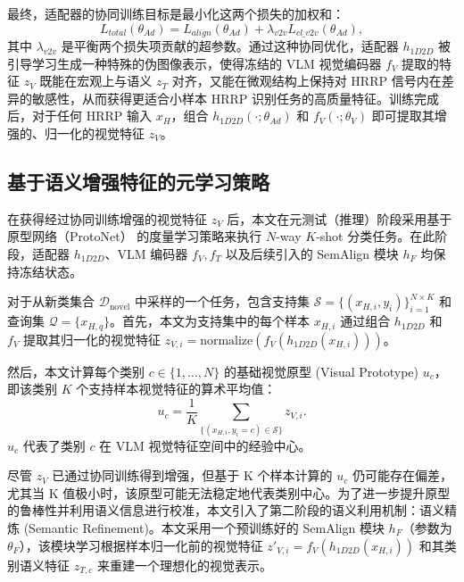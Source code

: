 最终，适配器的协同训练目标是最小化这两个损失的加权和： \begin{equation} L_{total}(\theta_{Ad}) = L_{align}(\theta_{Ad}) + \lambda_{v2v} L_{cl\_v2v}(\theta_{Ad}), \label{eq:adapter_total_loss} \end{equation} 其中 $\lambda_{v2v}$ 是平衡两个损失项贡献的超参数。通过这种协同优化，适配器 $h_{1D2D}$ 被引导学习生成一种特殊的伪图像表示，使得冻结的 VLM 视觉编码器 $f_V$ 提取的特征 $z_V$ 既能在宏观上与语义 $z_T$ 对齐，又能在微观结构上保持对 HRRP 信号内在差异的敏感性，从而获得更适合小样本 HRRP 识别任务的高质量特征。训练完成后，对于任何 HRRP 输入 $x_H$，组合 $h_{1D2D}(\cdot; \theta_{Ad})$ 和 $f_V(\cdot; \theta_V)$ 即可提取其增强的、归一化的视觉特征 $z_V$。

\subsection{基于语义增强特征的元学习策略}
\label{subsec:semantic_fsl_strategy}

在获得经过协同训练增强的视觉特征 $z_V$ 后，本文在元测试（推理）阶段采用基于原型网络（ProtoNet） 的度量学习策略来执行 $N$-way $K$-shot 分类任务。在此阶段，适配器 $h_{1D2D}$、VLM 编码器 $f_V, f_T$ 以及后续引入的 SemAlign 模块 $h_F$ 均保持冻结状态。

对于从新类集合 $\mathcal{D}_{\text{novel}}$ 中采样的一个任务，包含支持集 $\mathcal{S} = \{(x_{H,i}, y_i)\}_{i=1}^{N \times K}$ 和查询集 $\mathcal{Q} = \{x_{H,q}\}$。首先，本文为支持集中的每个样本 $x_{H,i}$ 通过组合 $h_{1D2D}$ 和 $f_V$ 提取其归一化的视觉特征 $z_{V,i} = \text{normalize}(f_V(h_{1D2D}(x_{H,i})))$。

然后，本文计算每个类别 $c \in \{1, \dots, N\}$ 的基础视觉原型 (Visual Prototype) $u_c$，即该类别 $K$ 个支持样本视觉特征的算术平均值：
\begin{equation} u_c = \frac{1}{K} \sum_{\{(x_{H,i}, y_i=c) \in \mathcal{S}\}} z_{V,i}. \label{eq:visual_prototype} \end{equation}
$u_c$ 代表了类别 $c$ 在 VLM 视觉特征空间中的经验中心。

尽管 $z_V$ 已通过协同训练得到增强，但基于 K 个样本计算的 $u_c$ 仍可能存在偏差，尤其当 K 值极小时，该原型可能无法稳定地代表类别中心。为了进一步提升原型的鲁棒性并利用语义信息进行校准，本文引入了第二阶段的语义利用机制：语义精炼 (Semantic Refinement)。本文采用一个预训练好的 SemAlign 模块 $h_F$（参数为 $\theta_F$），该模块学习根据样本归一化前的视觉特征 $z'_{V,i} = f_V(h_{1D2D}(x_{H,i}))$ 和其类别语义特征 $z_{T,c}$ 来重建一个理想化的视觉表示。

